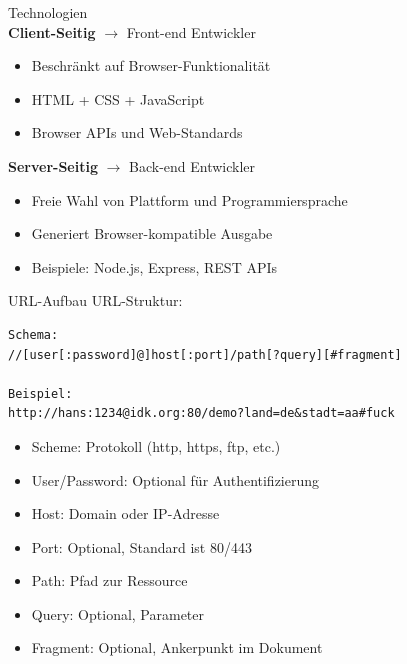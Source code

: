 \begin{concept}{Technologien}\\
    \textbf{Client-Seitig} $\rightarrow$ Front-end Entwickler
    \begin{itemize}
        \item Beschränkt auf Browser-Funktionalität
        \item HTML + CSS + JavaScript
        \item Browser APIs und Web-Standards
    \end{itemize}

    \textbf{Server-Seitig} $\rightarrow$ Back-end Entwickler
    \begin{itemize}
        \item Freie Wahl von Plattform und Programmiersprache
        \item Generiert Browser-kompatible Ausgabe
        \item Beispiele: Node.js, Express, REST APIs
    \end{itemize}
\end{concept}

\begin{KR}{URL-Aufbau}
    URL-Struktur: 
    \begin{lstlisting}[style=basesmol]
Schema:
//[user[:password]@]host[:port]/path[?query][#fragment]

Beispiel:
http://hans:1234@idk.org:80/demo?land=de&stadt=aa#fuck
    \end{lstlisting}
    \begin{itemize}
        \item Scheme: Protokoll (http, https, ftp, etc.)
        \item User/Password: Optional für Authentifizierung
        \item Host: Domain oder IP-Adresse
        \item Port: Optional, Standard ist 80/443
        \item Path: Pfad zur Ressource
        \item Query: Optional, Parameter
        \item Fragment: Optional, Ankerpunkt im Dokument
    \end{itemize}
\end{KR}